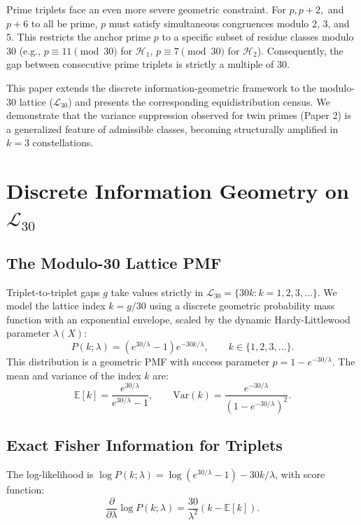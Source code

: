 \documentclass[11pt]{article}
\begin{document}
Prime triplets face an even more severe geometric constraint. For $p, p+2,$ and $p+6$ to all be prime, $p$ must satisfy simultaneous congruences modulo 2, 3, and 5. This restricts the anchor prime $p$ to a specific subset of residue classes modulo 30 (e.g., $p \equiv 11 \pmod{30}$ for $\mathcal{H}_1$, $p \equiv 7 \pmod{30}$ for $\mathcal{H}_2$). Consequently, the gap between consecutive prime triplets is strictly a multiple of 30.

This paper extends the discrete information-geometric framework to the modulo-30 lattice ($\mathcal{L}_{30}$) and presents the corresponding equidistribution census. We demonstrate that the variance suppression observed for twin primes (Paper 2) is a generalized feature of admissible classes, becoming structurally amplified in $k=3$ constellations.

\section{Discrete Information Geometry on $\mathcal{L}_{30}$}

\subsection{The Modulo-30 Lattice PMF}

Triplet-to-triplet gaps $g$ take values strictly in $\mathcal{L}_{30} = \{30k : k = 1, 2, 3, \ldots\}$. We model the lattice index $k = g/30$ using a discrete geometric probability mass function with an exponential envelope, scaled by the dynamic Hardy-Littlewood parameter $\lambda(X)$:
\begin{equation}
    P(k; \lambda) = \left(e^{30/\lambda} - 1\right) e^{-30k/\lambda}, \qquad k \in \{1, 2, 3, \ldots\}.
\end{equation}
This distribution is a geometric PMF with success parameter $p = 1 - e^{-30/\lambda}$. The mean and variance of the index $k$ are:
\begin{equation}
    \mathbb{E}[k] = \frac{e^{30/\lambda}}{e^{30/\lambda} - 1}, \qquad \text{Var}(k) = \frac{e^{-30/\lambda}}{(1 - e^{-30/\lambda})^2}.
\end{equation}

\subsection{Exact Fisher Information for Triplets}

The log-likelihood is $\log P(k; \lambda) = \log(e^{30/\lambda} - 1) - 30k/\lambda$, with score function:
\begin{equation}
    \frac{\partial}{\partial \lambda} \log P(k; \lambda) = \frac{30}{\lambda^2}\left(k - \mathbb{E}[k]\right).
\end{equation}
\end{document}

